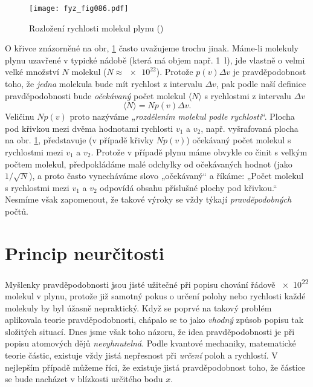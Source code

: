     \begin{figure}[ht!]  %
      \centering
      \texttt{[image: fyz\_fig086.pdf]}
      \caption{Rozložení rychlosti molekul plynu  (\cite[s.~88]{Feynman01})}
      \label{fyz:fig086}
    \end{figure}
    
    O křivce znázorněné na obr, \ref{fyz:fig086} často uvažujeme trochu jinak. Máme-li molekuly 
    plynu uzavřené v typické nádobě (která má objem např. \SI{1}{\litre}), jde vlastně o velmi 
    velké množství \(N\) molekul (\(N\approx\num{e22}\)). Protože \(p(v)\Delta v\) je 
    pravděpodobnost toho, že \emph{jedna} molekula bude mít rychlost z intervalu \(\Delta v\), pak 
    podle naší definice pravděpodobnosti bude \emph{očekávaný} počet molekul \(\langle N\rangle\) s 
    rychlostmi z intervalu \(\Delta v\)
    \begin{equation}\label{fyz:eq092}
      \langle N\rangle = Np(v)\Delta v.
    \end{equation}
    Veličinu \(Np(v)\) proto nazýváme „\emph{rozdělením molekul podle rychlosti}“. Plocha pod 
    křivkou mezi dvěma hodnotami rychlosti \(v_1\) a \(v_2\), např. vyšrafovaná plocha na obr. 
    \ref{fyz:fig086}, představuje (v případě křivky \(Np(v)\)) očekávaný počet molekul s rychlostmi 
    mezi \(v_1\) a \(v_2\). Protože v případě plynu máme obvykle co činit s velkým počtem molekul, 
    předpokládáme malé odchylky od očekávaných hodnot (jako \(1/\sqrt{N}\)), a proto často 
    vynecháváme slovo „očekávaný“ a říkáme: „Počet molekul s rychlostmi mezi \(v_1\) a \(v_2\) 
    odpovídá obsahu příslušné plochy pod křivkou.“ Nesmíme však zapomenout, že takové výroky se 
    vždy týkají \emph{pravděpodobných} počtů.
    
  \section{Princip neurčitosti}
    Myšlenky pravděpodobnosti jsou jisté užitečné při popisu chování řádově \num{e22} molekul v 
    plynu, protože již samotný pokus o určení polohy nebo rychlosti každé molekuly by byl úžasně 
    nepraktický. Když se poprvé na takový problém aplikovala teorie pravděpodobnosti, chápalo se to 
    jako \emph{vhodný} způsob popisu tak složitých situací. Dnes jsme však toho názoru, že idea 
    pravděpodobnosti je při popisu atomových dějů \emph{nevyhnutelná}. Podle kvantové mechaniky, 
    matematické teorie částic, existuje vždy jistá nepřesnost při \emph{určení} poloh a rychlostí. 
    V nejlepším případě můžeme říci, že existuje jistá pravděpodobnost toho, že částice se bude 
    nacházet v blízkosti určitého bodu \(x\).
    
